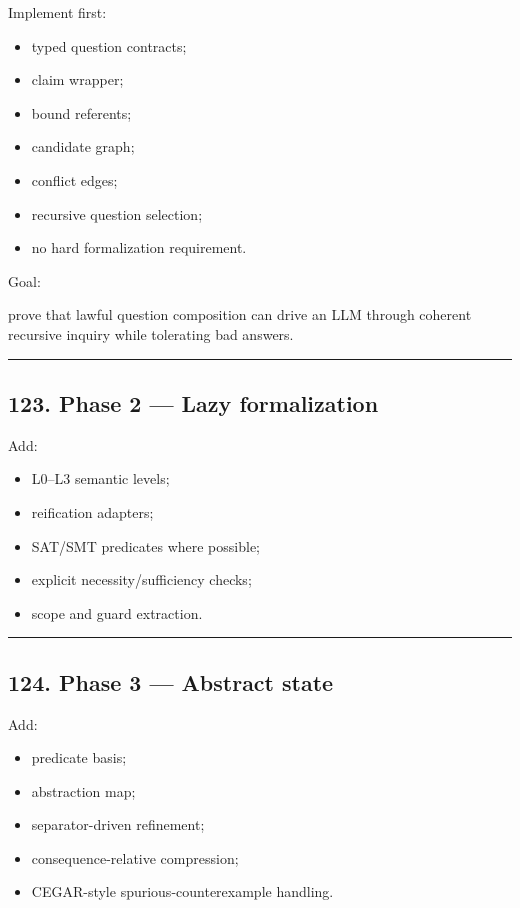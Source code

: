 \documentclass[
]{article}
\providecommand{\tightlist}{%
  \setlength{\itemsep}{0pt}\setlength{\parskip}{0pt}}
\begin{document}
Implement first:

\begin{itemize}
\tightlist
\item
  typed question contracts;
\item
  claim wrapper;
\item
  bound referents;
\item
  candidate graph;
\item
  conflict edges;
\item
  recursive question selection;
\item
  no hard formalization requirement.
\end{itemize}

Goal:

prove that lawful question composition can drive an LLM through coherent
recursive inquiry while tolerating bad answers.

\begin{center}\rule{0.5\linewidth}{0.5pt}\end{center}

\subsection{123. Phase 2 --- Lazy
formalization}\label{phase-2-lazy-formalization}

Add:

\begin{itemize}
\tightlist
\item
  L0--L3 semantic levels;
\item
  reification adapters;
\item
  SAT/SMT predicates where possible;
\item
  explicit necessity/sufficiency checks;
\item
  scope and guard extraction.
\end{itemize}

\begin{center}\rule{0.5\linewidth}{0.5pt}\end{center}

\subsection{124. Phase 3 --- Abstract
state}\label{phase-3-abstract-state}

Add:

\begin{itemize}
\tightlist
\item
  predicate basis;
\item
  abstraction map;
\item
  separator-driven refinement;
\item
  consequence-relative compression;
\item
  CEGAR-style spurious-counterexample handling.
\end{itemize}
\end{document}

